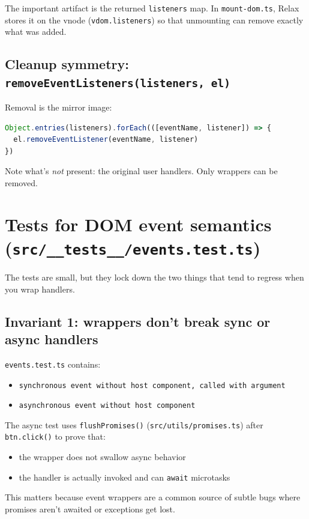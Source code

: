 The important artifact is the returned \texttt{listeners} map. In \texttt{mount-dom.ts}, Relax stores it on the vnode (\texttt{vdom.listeners}) so that unmounting can remove exactly what was added.

\subsection{Cleanup symmetry: \texttt{removeEventListeners(listeners, el)}}
Removal is the mirror image:

\begin{lstlisting}[language=JavaScript]
Object.entries(listeners).forEach(([eventName, listener]) => {
  el.removeEventListener(eventName, listener)
})
\end{lstlisting}

Note what's \emph{not} present: the original user handlers. Only wrappers can be removed.

\section{Tests for DOM event semantics (\texttt{src/\_\_tests\_\_/events.test.ts})}
The tests are small, but they lock down the two things that tend to regress when you wrap handlers.

\subsection{Invariant 1: wrappers don't break sync or async handlers}
	\texttt{events.test.ts} contains:

\begin{itemize}
  \item \texttt{synchronous event without host component, called with argument}
  \item \texttt{asynchronous event without host component}
\end{itemize}

The async test uses \texttt{flushPromises()} (\texttt{src/utils/promises.ts}) after \texttt{btn.click()} to prove that:

\begin{itemize}
  \item the wrapper does not swallow async behavior
  \item the handler is actually invoked and can \texttt{await} microtasks
\end{itemize}

This matters because event wrappers are a common source of subtle bugs where promises aren't awaited or exceptions get lost.

